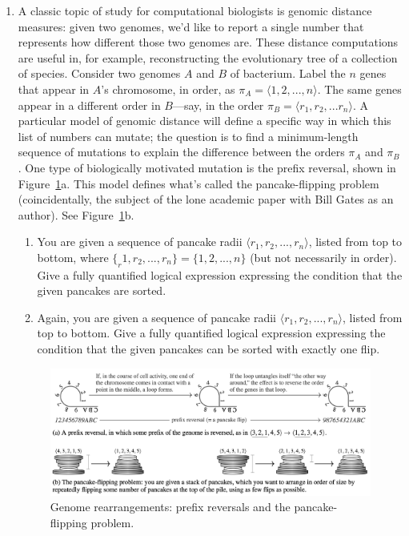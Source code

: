 \documentclass[11pt, oneside]{article}   	%
\begin{document}
\begin{enumerate}
\item 
A classic topic of study for computational biologists is genomic distance measures: 
given two genomes, we’d like to report a single number that represents how different those two genomes are. 
These distance computations are useful in, for example, reconstructing the evolutionary tree of a collection of species. 
Consider two genomes $A$ and $B$ of bacterium. 
Label the $n$ genes that appear in $A$’s chromosome, in order, as $\pi_A = \langle1, 2, . . . , n\rangle$. 
The same genes appear in a different order in $B$—say, in the order $\pi_B = \langle r_1,r_2,...r_n\rangle$. 
A particular model of genomic distance will define a specific way in which this list of numbers can mutate; 
the question is to find a minimum-length sequence of mutations to explain the difference between the orders $\pi_A$ and $\pi_B$. 
One type of biologically motivated mutation is the prefix reversal, shown in Figure~\ref{fig:HW5_bio_pancake}a. 
This model defines what’s called the pancake-flipping problem (coincidentally, the subject of the lone academic paper with Bill Gates as an author). 
See Figure~\ref{fig:HW5_bio_pancake}b.
\begin{enumerate}
\item You are given a sequence of pancake radii $\langle r_1,r_2,...,r_n\rangle$, listed from top to bottom, where $\{_r1,r_2,...,r_n\} = \{1,2,...,n\}$ 
(but not necessarily in order). 
Give a fully quantified logical expression expressing the condition that the given pancakes are sorted.


\item Again, you are given a sequence of pancake radii $\langle r_1,r_2,...,r_n\rangle$, listed from top to bottom. 
Give a fully quantified logical expression expressing the condition that the given pancakes can be sorted with exactly one flip.

\end{enumerate}

\begin{figure}
\includegraphics[width=\textwidth]{HW5_genome_pancake}
\caption{Genome rearrangements: prefix reversals and the pancake-flipping problem.}
\label{fig:HW5_bio_pancake}
\end{figure}


\end{enumerate}
\end{document}
